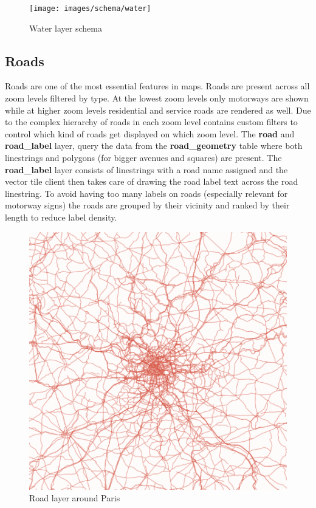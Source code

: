 \begin{figure}[H]
  \centering
  \texttt{[image: images/schema/water]}
  \caption{Water layer schema}
\end{figure}
    

\subsection{Roads}

\noindent\begin{minipage}[t]{0.48\linewidth}
    \vspace{0pt}
    Roads are one of the most essential features in maps. Roads are present across all zoom levels filtered by type. At the lowest zoom levels only motorways are shown while at higher zoom levels residential and service roads are rendered as well. Due to the complex hierarchy of roads in \osm{} each zoom level contains custom filters to control which kind of roads get displayed on which zoom level. The \textbf{road} and \textbf{road\_label} layer, query the data from the \textbf{road\_geometry} table where both linestrings and polygons (for bigger avenues and squares) are present.
    The \textbf{road\_label} layer consists of linestrings with a road name assigned and the vector tile client then takes care of drawing the road label text across the road linestring. To avoid having too many labels on roads (especially relevant for motorway signs) the roads are grouped by their vicinity and ranked by their length to reduce label density.
\end{minipage}
\hfill
\begin{minipage}[t]{0.48\linewidth}
    \vspace{-10pt}
    \begin{figure}[H]
      \includegraphics[width=1\textwidth]{images/schema/road_example}
      \caption{Road layer around Paris}
    \end{figure}
\end{minipage}

